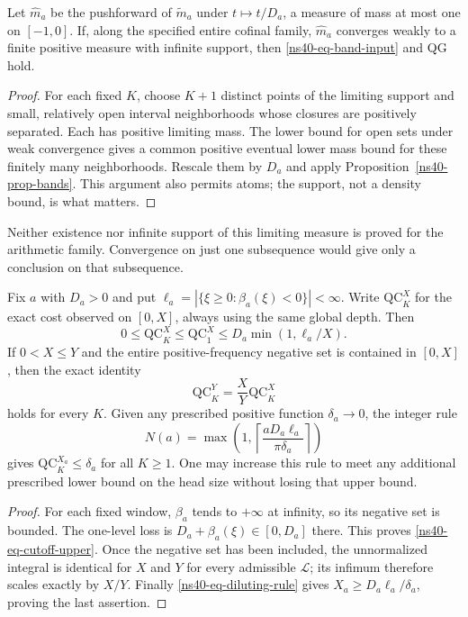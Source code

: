\begin{corollary}
\label{ns40-cor-shape}
Let $\widehat m_a$ be the pushforward of $\widetilde m_a$ under
$t\mapsto t/D_a$, a measure of mass at most one on $[-1,0]$.
If, along the specified entire cofinal family, $\widehat m_a$
converges weakly to a finite positive measure with infinite support,
then \eqref{ns40-eq-band-input} and QG hold.
\end{corollary}
\begin{proof}
For each fixed $K$, choose $K+1$ distinct points of the limiting
support and small, relatively open interval neighborhoods whose
closures are positively separated. Each has positive limiting mass.
The lower bound for open sets under weak convergence gives a
common positive eventual lower mass bound for these finitely many
neighborhoods. Rescale them by $D_a$ and apply
Proposition~\ref{ns40-prop-bands}. This argument also permits atoms;
the support, not a density bound, is what matters.
\end{proof}
Neither existence nor infinite support of this limiting measure is
proved for the arithmetic family. Convergence on just one subsequence
would give only a conclusion on that subsequence.

\begin{proposition}
\label{ns40-prop-cutoff}
Fix $a$ with $D_a>0$ and put
$\ell_a=|\{\xi\ge0:\beta_a(\xi)<0\}|<\infty$.
Write $\mathrm{QC}_K^{X}$ for the exact cost observed on $[0,X]$,
always using the same global depth. Then
\begin{equation}\label{ns40-eq-cutoff-upper}
 0\le\mathrm{QC}_K^{X}\le\mathrm{QC}_1^{X}
 \le D_a\min(1,\ell_a/X).
\end{equation}
If $0<X\le Y$ and the entire positive-frequency negative set is
contained in $[0,X]$, then the exact identity
\begin{equation}\label{ns40-eq-cutoff-scaling}
                  \mathrm{QC}_K^{Y}=\frac X Y\mathrm{QC}_K^{X}
\end{equation}
holds for every $K$. Given any prescribed positive function
$\delta_a\to0$, the integer rule
\begin{equation}\label{ns40-eq-diluting-rule}
 N(a)=\max\left(1,\left\lceil
             \frac{aD_a\ell_a}{\pi\delta_a}\right\rceil\right)
\end{equation}
gives $\mathrm{QC}_K^{X_a}\le\delta_a$ for all $K\ge1$.
One may increase this rule to meet any additional prescribed lower
bound on the head size without losing that upper bound.
\end{proposition}
\begin{proof}
For each fixed window, $\beta_a$ tends to $+\infty$ at infinity,
so its negative set is bounded. The one-level loss is
$D_a+\beta_a(\xi)\in[0,D_a]$ there. This proves
\eqref{ns40-eq-cutoff-upper}. Once the negative set has been included,
the unnormalized integral is identical for $X$ and $Y$ for every
admissible $\mathcal L$; its infimum therefore scales exactly by
$X/Y$. Finally \eqref{ns40-eq-diluting-rule} gives
$X_a\ge D_a\ell_a/\delta_a$, proving the last assertion.
\end{proof}

